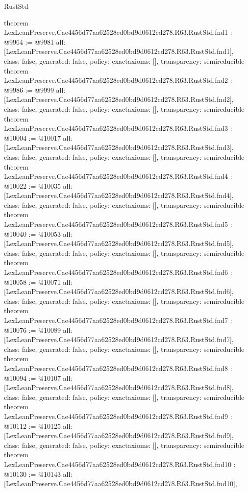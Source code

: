 \begin{lexlean}{RustStd}
\begin{coremodule}
{}
theorem LexLeanPreserve.Cae4456d77aa62528ed0bd9d0612cd278.R63.RustStd.fnd1 : @9964 := @9981 {
  all: [LexLeanPreserve.Cae4456d77aa62528ed0bd9d0612cd278.R63.RustStd.fnd1],
  class: false,
  generated: false,
  policy: exact{axioms: []},
  transparency: semireducible
}
theorem LexLeanPreserve.Cae4456d77aa62528ed0bd9d0612cd278.R63.RustStd.fnd2 : @9986 := @9999 {
  all: [LexLeanPreserve.Cae4456d77aa62528ed0bd9d0612cd278.R63.RustStd.fnd2],
  class: false,
  generated: false,
  policy: exact{axioms: []},
  transparency: semireducible
}
theorem LexLeanPreserve.Cae4456d77aa62528ed0bd9d0612cd278.R63.RustStd.fnd3 : @10004 := @10017 {
  all: [LexLeanPreserve.Cae4456d77aa62528ed0bd9d0612cd278.R63.RustStd.fnd3],
  class: false,
  generated: false,
  policy: exact{axioms: []},
  transparency: semireducible
}
theorem LexLeanPreserve.Cae4456d77aa62528ed0bd9d0612cd278.R63.RustStd.fnd4 : @10022 := @10035 {
  all: [LexLeanPreserve.Cae4456d77aa62528ed0bd9d0612cd278.R63.RustStd.fnd4],
  class: false,
  generated: false,
  policy: exact{axioms: []},
  transparency: semireducible
}
theorem LexLeanPreserve.Cae4456d77aa62528ed0bd9d0612cd278.R63.RustStd.fnd5 : @10040 := @10053 {
  all: [LexLeanPreserve.Cae4456d77aa62528ed0bd9d0612cd278.R63.RustStd.fnd5],
  class: false,
  generated: false,
  policy: exact{axioms: []},
  transparency: semireducible
}
theorem LexLeanPreserve.Cae4456d77aa62528ed0bd9d0612cd278.R63.RustStd.fnd6 : @10058 := @10071 {
  all: [LexLeanPreserve.Cae4456d77aa62528ed0bd9d0612cd278.R63.RustStd.fnd6],
  class: false,
  generated: false,
  policy: exact{axioms: []},
  transparency: semireducible
}
theorem LexLeanPreserve.Cae4456d77aa62528ed0bd9d0612cd278.R63.RustStd.fnd7 : @10076 := @10089 {
  all: [LexLeanPreserve.Cae4456d77aa62528ed0bd9d0612cd278.R63.RustStd.fnd7],
  class: false,
  generated: false,
  policy: exact{axioms: []},
  transparency: semireducible
}
theorem LexLeanPreserve.Cae4456d77aa62528ed0bd9d0612cd278.R63.RustStd.fnd8 : @10094 := @10107 {
  all: [LexLeanPreserve.Cae4456d77aa62528ed0bd9d0612cd278.R63.RustStd.fnd8],
  class: false,
  generated: false,
  policy: exact{axioms: []},
  transparency: semireducible
}
theorem LexLeanPreserve.Cae4456d77aa62528ed0bd9d0612cd278.R63.RustStd.fnd9 : @10112 := @10125 {
  all: [LexLeanPreserve.Cae4456d77aa62528ed0bd9d0612cd278.R63.RustStd.fnd9],
  class: false,
  generated: false,
  policy: exact{axioms: []},
  transparency: semireducible
}
theorem LexLeanPreserve.Cae4456d77aa62528ed0bd9d0612cd278.R63.RustStd.fnd10 : @10130 := @10143 {
  all: [LexLeanPreserve.Cae4456d77aa62528ed0bd9d0612cd278.R63.RustStd.fnd10],
}
\end{coremodule}
\end{lexlean}
